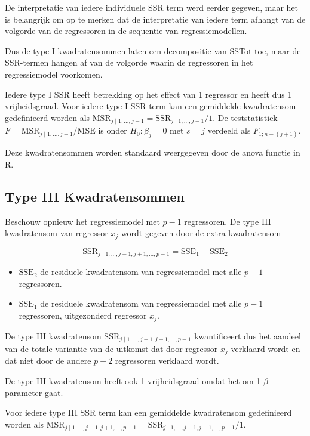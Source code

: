 \documentclass[
  12pt,dutch,coursenotes]{book}
\providecommand{\tightlist}{%
  \setlength{\itemsep}{0pt}\setlength{\parskip}{0pt}}
\theoremstyle{definition}
\theoremstyle{definition}
\theoremstyle{definition}
\theoremstyle{remark}
\begin{document}
De interpretatie van iedere individuele SSR term werd eerder gegeven, maar het is belangrijk om op te merken dat de interpretatie van iedere term afhangt van de volgorde van de regressoren in de sequentie van regressiemodellen.

Dus de type I kwadratensommen laten een decompositie van SSTot toe, maar de SSR-termen hangen af van de volgorde waarin de regressoren in het regressiemodel voorkomen.

Iedere type I SSR heeft betrekking op het effect van 1 regressor en heeft dus 1 vrijheidsgraad.
Voor iedere type I SSR term kan een gemiddelde kwadratensom gedefinieerd worden als \(\text{MSR}_{j\mid 1,\ldots, j-1}=\text{SSR}_{j\mid 1,\ldots, j-1}/1\).
De teststatistiek \(F=\text{MSR}_{j\mid 1,\ldots, j-1}/\text{MSE}\) is onder \(H_0:\beta_j=0\) met \(s=j\) verdeeld als \(F_{1;n-(j+1)}\).

Deze kwadratensommen worden standaard weergegeven door de anova functie in R.

\hypertarget{type-iii-kwadratensommen}{%
\subsection{Type III Kwadratensommen}\label{type-iii-kwadratensommen}}

Beschouw opnieuw het regressiemodel met \(p-1\) regressoren.
De type III kwadratensom van regressor \(x_j\) wordt gegeven door de extra kwadratensom

\[
  \text{SSR}_{j \mid 1,\ldots, j-1,j+1,\ldots, p-1} = \text{SSE}_1-\text{SSE}_2
\]

\begin{itemize}
\tightlist
\item
  \(\text{SSE}_2\) de residuele kwadratensom van regressiemodel met alle \(p-1\) regressoren.
\item
  \(\text{SSE}_1\) de residuele kwadratensom van regressiemodel met alle \(p-1\) regressoren, uitgezonderd regressor \(x_j\).
\end{itemize}

De type III kwadratensom \(\text{SSR}_{j \mid 1,\ldots, j-1,j+1,\ldots, p-1}\) kwantificeert dus het aandeel van de totale variantie van de uitkomst dat door regressor \(x_j\) verklaard wordt en dat niet door de andere \(p-2\) regressoren verklaard wordt.

De type III kwadratensom heeft ook 1 vrijheidsgraad omdat het om 1 \(\beta\)-parameter gaat.

Voor iedere type III SSR term kan een gemiddelde kwadratensom gedefinieerd worden als \(\text{MSR}_{j \mid 1,\ldots, j-1,j+1,\ldots, p-1}=\text{SSR}_{j \mid 1,\ldots, j-1,j+1,\ldots, p-1}/1\).
\end{document}
